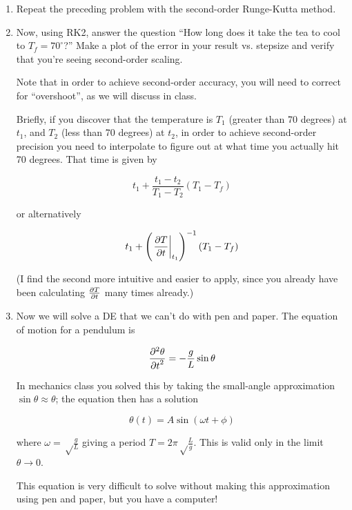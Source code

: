 \documentclass[12pt]{article}
\def\PAR#1#2{ {{\partial #1}\over{\partial #2}} }
\def\PARTWO#1#2{ {{\partial^2 #1}\over{\partial #2}^2} }
\begin{document}
\begin{enumerate}
\item{Repeat the preceding problem with the second-order Runge-Kutta method.}

\item{Now, using RK2, answer the question ``How long does it take the tea to cool to $T_f=70^\circ$?'' Make a plot of the error in your result vs. stepsize and verify that you're seeing second-order scaling. 

Note that in order to achieve second-order accuracy, you will need to correct for ``overshoot'', as we will discuss in class. 

Briefly, if you discover that the temperature is $T_1$ (greater than 70 degrees) at $t_1$, and $T_2$ (less than 70 degrees) at $t_2$, in order to achieve second-order precision you need to interpolate to figure out at what time you actually hit 70 degrees. That time is given by

\begin{equation}
t_1 + \frac{t_1-t_2}{T_1-T_2} (T_1-T_f)
\end{equation}

or alternatively

\begin{equation}
t_1 + \left(\left.\PAR{T}{t}\right|_{t_1}\right)^{-1} (T_1-T_f)
\end{equation}

(I find the second more intuitive and easier to apply, since you already have been calculating $\PAR{T}{t}$ many times already.)

}


\item Now we will solve a DE that we can't do with pen and paper. The equation of motion for a pendulum is

\begin{equation}
\PARTWO{\theta}{t}=-\frac{g}{L} \sin \theta
\end{equation}

In mechanics class you solved this by taking the small-angle approximation $\sin \theta \approx \theta$; the equation then has a solution

\begin{equation}
\theta(t) = A \sin (\omega t + \phi)
\end{equation}

where $\omega=\sqrt\frac{g}{L}$ giving a period $T=2\pi\sqrt\frac{L}{g}$. This is valid only in the limit $\theta \rightarrow 0$.

This equation is very difficult to solve without making this approximation using pen and paper, but you have a computer! 


\end{enumerate}
\end{document}
